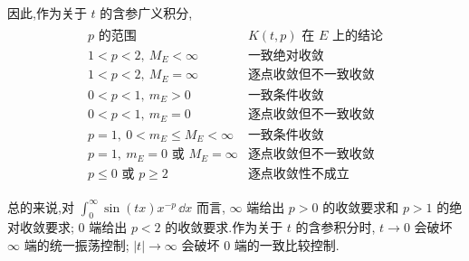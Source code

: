 \begin{exbox}
\begin{enumerate}
		因此,作为关于 $t$ 的含参广义积分,
		\begin{gather*}
		\begin{array}{c|c}
			p\text{ 的范围}&K(t,p)\text{ 在 }E\text{ 上的结论}\\ \hline
			1<p<2,\ M_E<\infty&\text{一致绝对收敛}\\[3pt]
			1<p<2,\ M_E=\infty&\text{逐点收敛但不一致收敛}\\[3pt]
			0<p<1,\ m_E>0&\text{一致条件收敛}\\[3pt]
			0<p<1,\ m_E=0&\text{逐点收敛但不一致收敛}\\[3pt]
			p=1,\ 0<m_E\leq M_E<\infty&\text{一致条件收敛}\\[3pt]
			p=1,\ m_E=0\text{ 或 }M_E=\infty&\text{逐点收敛但不一致收敛}\\[3pt]
			p\leq0\text{ 或 }p\geq2&\text{逐点收敛性不成立}
		\end{array}
		\end{gather*}
	\end{enumerate}
\end{exbox}

总的来说,对 $\int_0^\infty \sin(tx)x^{-p}\,\dd x$ 而言, $\infty$ 端给出 $p>0$ 的收敛要求和 $p>1$ 的绝对收敛要求; $0$ 端给出 $p<2$ 的收敛要求.作为关于 $t$ 的含参积分时, $t\to0$ 会破坏 $\infty$ 端的统一振荡控制; $|t|\to\infty$ 会破坏 $0$ 端的一致比较控制.

